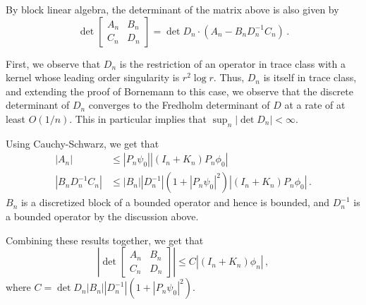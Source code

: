 By block linear algebra, the determinant of the matrix above is also given by
\begin{equation}
\det{
\begin{bmatrix}
A_{n} & B_{n} \\
C_{n} & D_{n} 
\end{bmatrix} 
}
= \det{D_{n}} \cdot (A_{n} - B_{n} D_{n}^{-1} C_{n}) \,.
\end{equation}

First, we observe that $D_{n}$ is the restriction of an operator in trace class
with a kernel whose leading order singularity is $r^{2} \log{r}$. 
{\color{red} Thus, $D_{n}$ is itself in trace class, and extending the proof of Bornemann to this case,
we observe that the discrete determinant of $D_{n}$ converges to the Fredholm determinant
of $D$ at a rate of at least $O(1/n)$. This in particular implies that
$\sup_{n} |\det{D_{n}}| <\infty$}.


Using Cauchy-Schwarz, we get that
\begin{equation}
\begin{aligned}
|A_{n}| &\leq |P_{n} \psi_{0}| |(I_{n} + K_{n})P_{n} \phi_{0}| \\
|B_{n}D_{n}^{-1} C_{n}| &\leq |B_{n}||D_{n}^{-1}|(1+ |P_{n} \psi_{0}|^2) |(I_{n} + K_{n})P_{n} \phi_{0}| \,.
\end{aligned}
\end{equation}
$B_{n}$ is a discretized block of a bounded operator and hence is bounded, 
and $D_{n}^{-1}$ is a bounded operator by the discussion above. 

Combining these results together, we get that
\begin{equation}
\left| \det{\begin{bmatrix} A_{n} & B_{n} \\ C_{n} & D_{n} \end{bmatrix}} \right| \leq C |(I_{n} + K_{n})\phi_{n}| \, ,
\end{equation}
where $C = \det{D_{n}} |B_{n}||D_{n}^{-1}| (1 + |P_{n} \psi_{0}|^2)$.

